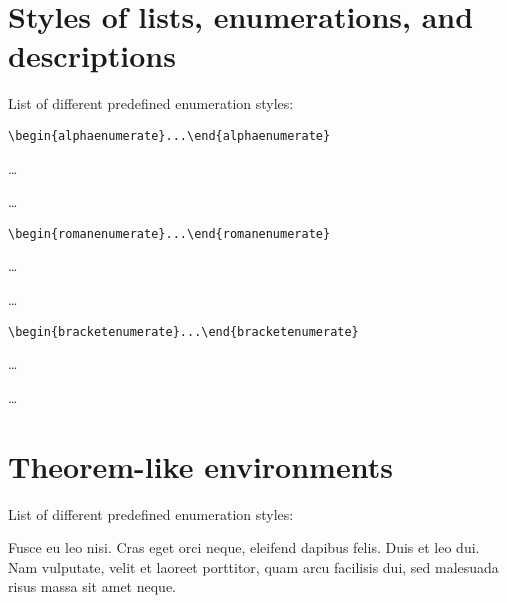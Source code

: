 \documentclass[a4paper,UKenglish,numberwithinsect,cleveref,thm-restate]{lipics-v2021}
\begin{document}



\appendix


\section{Styles of lists, enumerations, and descriptions}\label{sec:itemStyles}

List of different predefined enumeration styles:

\begin{alphaenumerate}
\item \verb|\begin{alphaenumerate}...\end{alphaenumerate}|
\item \dots
\item \dots
\end{alphaenumerate}

\begin{romanenumerate}
\item \verb|\begin{romanenumerate}...\end{romanenumerate}|
\item \dots
\item \dots
\end{romanenumerate}

\begin{bracketenumerate}
\item \verb|\begin{bracketenumerate}...\end{bracketenumerate}|
\item \dots
\item \dots
\end{bracketenumerate}


\section{Theorem-like environments}\label{sec:theorem-environments}

List of different predefined enumeration styles:


\begin{note}\label{testenv-note}
Fusce eu leo nisi. Cras eget orci neque, eleifend dapibus felis. Duis et leo dui. Nam vulputate, velit et laoreet porttitor, quam arcu facilisis dui, sed malesuada risus massa sit amet neque.
\end{note}
\end{document}
